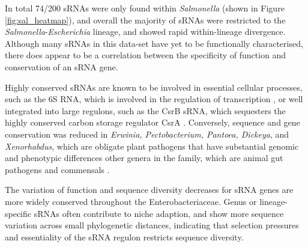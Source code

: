 In total 74/200 sRNAs were only found within \textit{Salmonella} (shown in Figure \ref{fig:sal_heatmap}), and overall the majority of sRNAs were restricted to the \textit{Salmonella}-\textit{Escherichia} lineage, and showed rapid within-lineage divergence. Although many sRNAs in this data-set have yet to be functionally characterised, there does appear to be a correlation between the specificity of function and conservation of an sRNA gene. 

Highly conserved sRNAs are known to be involved in essential cellular processes, such as the 6S RNA, which is involved in the regulation of transcription \citep{Wassarman2007-dxx}, or well integrated into large regulons, such as the CsrB sRNA, which sequesters the highly conserved carbon storage regulator CsrA \citep{Babitzke2007-bb}. Conversely, sequence and gene conservation was reduced in \textit{Erwinia, Pectobacterium, Pantoea, Dickeya}, and \textit{Xenorhabdus}, which are obligate plant pathogens that have substantial genomic and phenotypic differences other genera in the family, which are animal gut pathogens and commensals \citep{Toth2006-xt}. 

The variation of function and sequence diversity decreases for sRNA genes are more widely conserved throughout the Enterobacteriaceae. Genus or lineage-specific sRNAs often contribute to niche adaption, and show more sequence variation across small phylogenetic distances, indicating that selection pressures and essentiality of the sRNA regulon restricts sequence diversity. 

